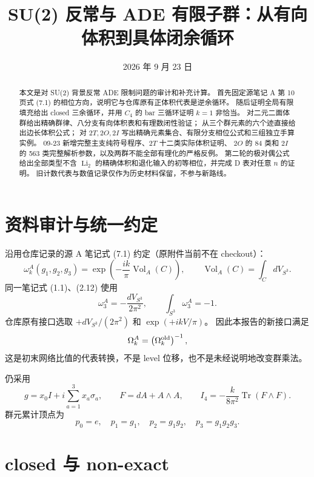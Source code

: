 \documentclass[UTF8,11pt,fontset=none]{ctexart}
\title{SU(2) 反常与 ADE 有限子群：从有向体积到具体闭余循环}
\author{}
\date{2026 年 9 月 23 日}
\newcommand{\Tr}{\operatorname{Tr}}
\newcommand{\Vol}{\operatorname{Vol}}
\newcommand{\Li}{\operatorname{Li}}
\theoremstyle{definition}
\begin{document}
\maketitle
\begin{abstract}
本文是对 SU(2) 背景反常 ADE 限制问题的审计和补充计算。
首先固定源笔记 A 第 10 页式 (7.1) 的相位方向，说明它与仓库原有正体积代表是逆余循环。
随后证明全局有限填充给出 closed 三余循环，并用 $C_4$ 的 bar 三循环证明 $k=1$ 非恰当。
对二元二面体群给出精确群律、八分支有向体积表和有理数闭性验证；
从三个群元素的六个迹直接给出边长体积公式；
对 $2T,2O,2I$ 写出精确元素集合、有限分支相位公式和三组独立手算实例。
09-23 新增完整主支纯符号程序、$2T$ 十二类实际体积证明、
$2O$ 的 84 类和 $2I$ 的 563 类完整解析参数，以及两群不能全部有理化的严格反例。
第二轮的极对偶公式给出全部类型不含 $\Li_2$ 的精确体积和退化输入的初等相位，并完成 D 表对任意 $n$ 的证明。
旧计数代表与数值记录仅作为历史材料保留，不参与新路线。
\end{abstract}

\tableofcontents
\clearpage
\fi

\section{资料审计与统一约定}

沿用仓库记录的源 A 笔记式 (7.1) 约定（原附件当前不在 checkout）：
\begin{equation}
 \omega_k^{A}(g_1,g_2,g_3)=
 \exp\left(-\frac{ik}{\pi}\Vol_A(C)\right),
 \qquad \Vol_A(C)=\int_C dV_{S^3}.
 \label{eq:source-sign}
\end{equation}
同一笔记式 (1.1)、(2.12) 使用
\[
 \omega_3^A=-\frac{dV_{S^3}}{2\pi^2},
 \qquad \int_{S^3}\omega_3^A=-1.
\]
仓库原有接口选取 $+dV_{S^3}/(2\pi^2)$ 和 $\exp(+ikV/\pi)$。
因此本报告的新接口满足
\begin{equation}
 \omega_k^{A}=\left(\omega_k^{\rm old}\right)^{-1},
 \label{eq:inverse-convention}
\end{equation}
这是初末网络比值的代表转换，不是 level 位移，也不是未经说明地改变群乘法。

仍采用
\[
g=x_0I+i\sum_{a=1}^3x_a\sigma_a,\qquad
F=dA+A\wedge A,\qquad
I_4=-\frac{k}{8\pi^2}\Tr(F\wedge F).
\]
群元累计顶点为
\[
p_0=e,\quad p_1=g_1,\quad p_2=g_1g_2,\quad p_3=g_1g_2g_3.
\]





\section{closed 与 non-exact}
\end{document}
